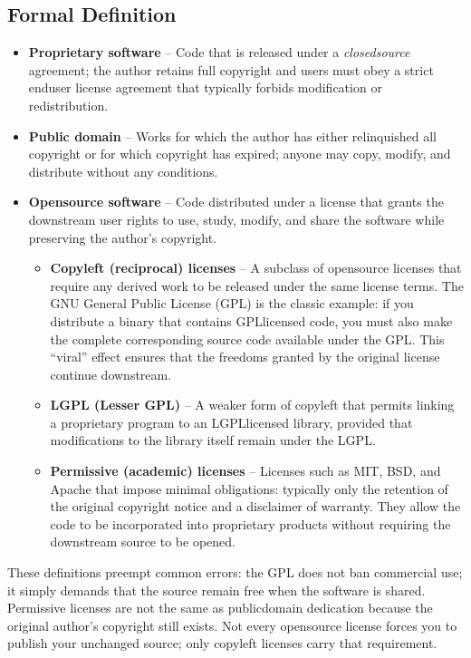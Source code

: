 \documentclass[12pt, a4paper]{article}
\begin{document}
\subsection{Formal Definition}
\begin{itemize}
  \item \textbf{Proprietary software} -- Code that is released under a \emph{closedsource} agreement; the author retains full copyright and users must obey a strict enduser license agreement that typically forbids modification or redistribution.
  \item \textbf{Public domain} -- Works for which the author has either relinquished all copyright or for which copyright has expired; anyone may copy, modify, and distribute without any conditions.
  \item \textbf{Opensource software} -- Code distributed under a license that grants the downstream user rights to use, study, modify, and share the software while preserving the author's copyright.
  \begin{itemize}
    \item \textbf{Copyleft (reciprocal) licenses} -- A subclass of opensource licenses that require any derived work to be released under the same license terms. The GNU General Public License (GPL) is the classic example: if you distribute a binary that contains GPLlicensed code, you must also make the complete corresponding source code available under the GPL. This ``viral'' effect ensures that the freedoms granted by the original license continue downstream.
    \item \textbf{LGPL (Lesser GPL)} -- A weaker form of copyleft that permits linking a proprietary program to an LGPLlicensed library, provided that modifications to the library itself remain under the LGPL.
    \item \textbf{Permissive (academic) licenses} -- Licenses such as MIT, BSD, and Apache that impose minimal obligations: typically only the retention of the original copyright notice and a disclaimer of warranty. They allow the code to be incorporated into proprietary products without requiring the downstream source to be opened.
  \end{itemize}
\end{itemize}
These definitions preempt common errors: the GPL does not ban commercial use; it simply demands that the source remain free when the software is shared. Permissive licenses are not the same as publicdomain dedication because the original author's copyright still exists. Not every opensource license forces you to publish your unchanged source; only copyleft licenses carry that requirement.
\end{document}
